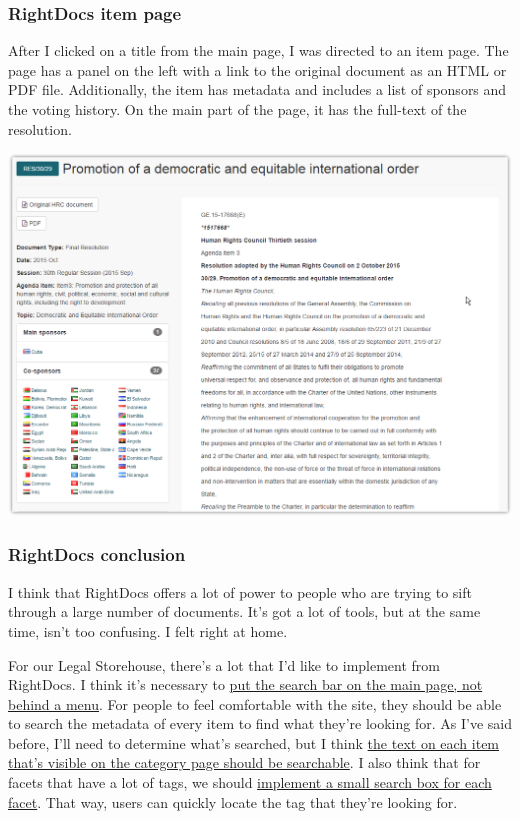 \documentclass{article}
\begin{document}
\subsubsection{RightDocs item page}
After I clicked on a title from the main page, I was directed to an item page. The page has a panel on the left with a link to the original document as an HTML or PDF file. Additionally, the item has metadata and includes a list of sponsors and the voting history. On the main part of the page, it has the full-text of the resolution.

\noindent\includegraphics[width=\textwidth]{2016-06-09-RightDocs-Item}

\subsubsection{RightDocs conclusion}
I think that RightDocs offers a lot of power to people who are trying to sift through a large number of documents. It's got a lot of tools, but at the same time, isn't too confusing. I felt right at home.

For our Legal Storehouse, there's a lot that I'd like to implement from RightDocs. I think it's necessary to \ul{put the search bar on the main page, not behind a menu}. For people to feel comfortable with the site, they should be able to search the metadata of every item to find what they're looking for. As I've said before, I'll need to determine what's searched, but I think \ul{the text on each item that's visible on the category page should be searchable}. I also think that for facets that have a lot of tags, we should \ul{implement a small search box for each facet}. That way, users can quickly locate the tag that they're looking for.
\end{document}
